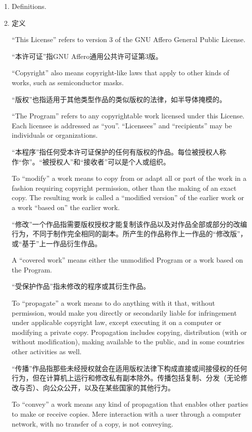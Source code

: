 \documentclass[11pt]{article}
\begin{document}
\begin{enumerate}

\addtocounter{enumi}{-1}

\item Definitions.
\item 定义

``This License'' refers to version 3 of the GNU Affero General Public License.

“本许可证”指GNU Affero通用公共许可证第3版。

``Copyright'' also means copyright-like laws that apply to other kinds of
works, such as semiconductor masks.

“版权”也指适用于其他类型作品的类似版权的法律，如半导体掩模的。

``The Program'' refers to any copyrightable work licensed under this
License.  Each licensee is addressed as ``you''.  ``Licensees'' and
``recipients'' may be individuals or organizations.

“本程序”指任何受本许可证保护的任何有版权的作品。每位被授权人称作“你”。“被授权人”和“接收者”可以是个人或组织。

To ``modify'' a work means to copy from or adapt all or part of the work
in a fashion requiring copyright permission, other than the making of an
exact copy.  The resulting work is called a ``modified version'' of the
earlier work or a work ``based on'' the earlier work.

“修改”一个作品指需要版权授权才能复制该作品以及对作品全部或部分的改编行为，不同于制作完全相同的副本。所产生的作品称作上一作品的“修改版”，或“基于”上一作品衍生作品。

A ``covered work'' means either the unmodified Program or a work based
on the Program.

“受保护作品”指未修改的程序或其衍生作品。

To ``propagate'' a work means to do anything with it that, without
permission, would make you directly or secondarily liable for
infringement under applicable copyright law, except executing it on a
computer or modifying a private copy.  Propagation includes copying,
distribution (with or without modification), making available to the
public, and in some countries other activities as well.

“传播”作品指那些未经授权就会在适用版权法律下构成直接或间接侵权的任何行为，但在计算机上运行和修改私有副本除外。传播包括复制、分发（无论修改与否）、向公众公开，以及在某些国家的其他行为。

To ``convey'' a work means any kind of propagation that enables other
parties to make or receive copies.  Mere interaction with a user through
a computer network, with no transfer of a copy, is not conveying.


\end{enumerate}
\end{document}
